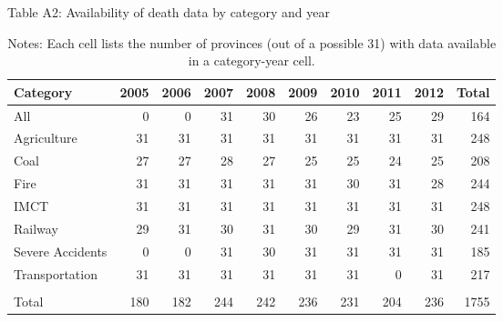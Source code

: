 \begin{table}[htbp]\centering\captionsetup{width=0.8\textwidth}\footnotesize{
\caption{Table A2: Availability of death data by category and year}
\begin{tabular}{l  r r r r r r r r r}
\hline\hline
Category     & 2005 & 2006 & 2007 & 2008 & 2009 & 2010 & 2011 & 2012 & Total \\
\hline
All&0&0&31&30&26&23&25&29&164\\
Agriculture&31&31&31&31&31&31&31&31&248\\
Coal&27&27&28&27&25&25&24&25&208\\
Fire&31&31&31&31&31&30&31&28&244\\
IMCT&31&31&31&31&31&31&31&31&248\\
Railway&29&31&30&31&30&29&31&30&241\\
Severe Accidents&0&0&31&30&31&31&31&31&185\\
Transportation&31&31&31&31&31&31&0&31&217\\
\\
Total&180&182&244&242&236&231&204&236&1755\\
\hline
\end{tabular}}
\caption{Notes: Each cell lists the number of provinces (out of a possible 31) with data available in a category-year cell.}
\end{table}
